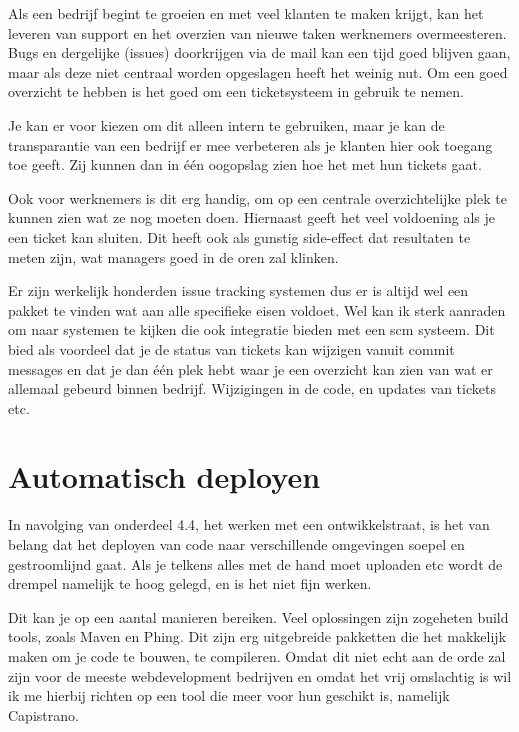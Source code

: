 Als een bedrijf begint te groeien en met veel klanten te maken krijgt, kan het leveren van support en het overzien van nieuwe taken werknemers overmeesteren. Bugs en dergelijke (issues) doorkrijgen via de mail kan een tijd goed blijven gaan, maar als deze niet centraal worden opgeslagen heeft het weinig nut. Om een goed overzicht te hebben is het goed om een ticketsysteem in gebruik te nemen.

Je kan er voor kiezen om dit alleen intern te gebruiken, maar je kan de transparantie van een bedrijf er mee verbeteren als je klanten hier ook toegang toe geeft. Zij kunnen dan in \'{e}\'{e}n oogopslag zien hoe het met hun tickets gaat.

Ook voor werknemers is dit erg handig, om op een centrale overzichtelijke plek te kunnen zien wat ze nog moeten doen.  Hiernaast geeft het veel voldoening als je een ticket kan sluiten. Dit heeft ook als gunstig side-effect dat resultaten te meten zijn, wat managers goed in de oren zal klinken.

Er zijn werkelijk honderden issue tracking systemen\cite{issuetracking} dus er is altijd wel een pakket te vinden wat aan alle specifieke eisen voldoet. Wel kan ik sterk aanraden om naar systemen te kijken die ook integratie bieden met een {\sc scm} systeem. Dit bied als voordeel dat je de status van tickets kan wijzigen vanuit commit messages en dat je dan \'{e}\'{e}n plek hebt waar je een overzicht kan zien van wat er allemaal gebeurd binnen bedrijf. Wijzigingen in de code, en updates van tickets etc.

\section{Automatisch deployen}

In navolging van onderdeel 4.4, het werken met een ontwikkelstraat, is het van belang dat het deployen van code naar verschillende omgevingen soepel en gestroomlijnd gaat. Als je telkens alles met de hand moet uploaden etc wordt de drempel namelijk te hoog gelegd, en is het niet fijn werken.

Dit kan je op een aantal manieren bereiken. Veel oplossingen zijn zogeheten build tools, zoals Maven\cite{maven} en Phing\cite{phing}. Dit zijn erg uitgebreide pakketten die het makkelijk maken om je code te bouwen, te compileren. Omdat dit niet echt aan de orde zal zijn voor de meeste webdevelopment bedrijven en omdat het vrij omslachtig is wil ik me hierbij richten op een tool die meer voor hun geschikt is, namelijk Capistrano\cite{capistrano}.

